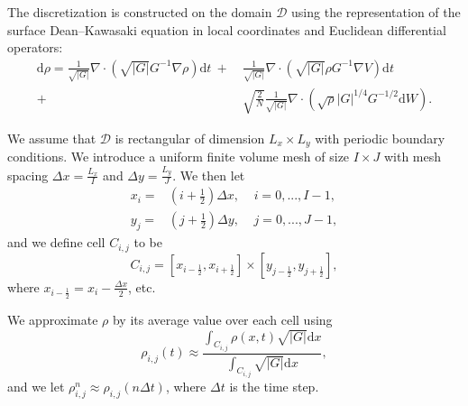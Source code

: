 \documentclass[11pt, a4paper]{article}
\newcommand{\mathd}{\mathrm{d}}
\newcommand{\jacdat}{\sqrt{|G|}}
\newcommand{\half}{\frac{1}{2}}
\begin{document}
The discretization is constructed on the domain $\mathcal{D}$ using the
representation of the surface Dean--Kawasaki equation in local coordinates and Euclidean differential operators:
\begin{align}
    \mathd\rho =\frac{1}{\sqrt{|G|}}\nabla \cdot (\sqrt{|G|}G^{-1}\nabla \rho)\mathd t \ + \ & \frac{1}{\sqrt{|G|}}\nabla \cdot ( \sqrt{|G|} \rho G^{-1}\nabla V)\mathd t \nonumber \\ +\ & \sqrt{\frac{2}{N}} \frac{1}{\sqrt{|G|}} \nabla \cdot (\sqrt{\rho} |G|^{1/4}G^{-1/2}\mathd W) .
    \label{eq:instrinic_form}
\end{align}


We assume that $\mathcal{D}$ is rectangular of dimension $L_x \times L_y$ with periodic boundary conditions.
We introduce a uniform finite volume mesh of size $I\times J$  with mesh spacing $\Delta x = \frac{L_x}{I}$ and $\Delta y = \frac{L_y}{J}$.  We then let
\begin{align*}
x_{i} =&( i+\frac{1}{2}) \Delta x, \;\;\;\;i= 0,...,I-1, \\
y_{j} =&( j+\frac{1}{2}) \Delta y, \;\;\;\;j= 0,...,J-1,
\end{align*}
and we define cell  $C_{i,j}$ to be
\[
C_{i,j} = [x_{i-\half},x_{i+\half}] \times  [y_{j-\half},y_{j+\half}],
\]
where $x_{i-\half} = x_i - \frac{\Delta x}{2}$, etc.

We approximate $\rho$ by its average value over each cell using
\[
\rho_{i,j} (t)
 \approx  \frac {\int_{C_{i,j}} \rho(x,t) \jacdat \mathd x }{\int_{C_{i,j}} \jacdat \mathd x},
\]
and we let $\rho_{i,j}^n \approx \rho_{i,j}(n \Delta t)$, where $\Delta t$ is the time step.
\end{document}
